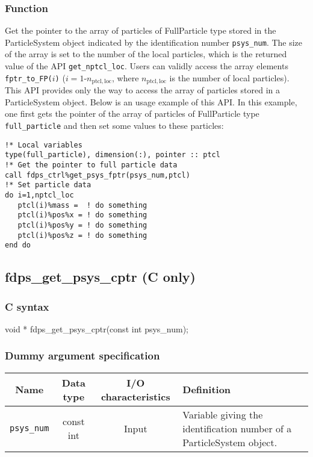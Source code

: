 \subsubsection*{Function}
Get the pointer to the array of particles of FullParticle type stored in the ParticleSystem object indicated by the identification number \texttt{psys\_num}. The size of the array is set to the number of the local particles, which is the returned value of the API \texttt{get\_nptcl\_loc}. Users can validly access the array elements \texttt{fptr\_to\_FP(}$i$\texttt{)} ($i=1$-$n_{\mathrm{ptcl,loc}}$, where $n_{\mathrm{ptcl,loc}}$ is the number of local particles). This API provides only the way to access the array of particles stored in a ParticleSystem object. Below is an usage example of this API. In this example, one first gets the pointer of the array of particles of FullParticle type \texttt{full\_particle} and then set some values to these particles:
\begin{lstlisting}[caption=An usage example of API \texttt{get\_psys\_fptr}]
!* Local variables
type(full_particle), dimension(:), pointer :: ptcl
!* Get the pointer to full particle data
call fdps_ctrl%get_psys_fptr(psys_num,ptcl)
!* Set particle data
do i=1,nptcl_loc
   ptcl(i)%mass =  ! do something
   ptcl(i)%pos%x = ! do something
   ptcl(i)%pos%y = ! do something
   ptcl(i)%pos%z = ! do something
end do
\end{lstlisting}

\clearpage

\subsection{fdps\_get\_psys\_cptr {\small (C only)}}
\subsubsection*{C syntax}
\begin{screen}
\begin{spverbatim}
void * fdps_get_psys_cptr(const int psys_num);
\end{spverbatim}
\end{screen}

\subsubsection*{Dummy argument specification}
\begin{table}[h]
\begin{tabularx}{\linewidth}{cccX}
\toprule
\rowcolor{Snow2}
Name & Data type & I/O characteristics & Definition \\
\midrule
\texttt{psys\_num} & const int & Input & Variable giving the identification number of a ParticleSystem object.\\
\bottomrule
\end{tabularx}
\end{table}

